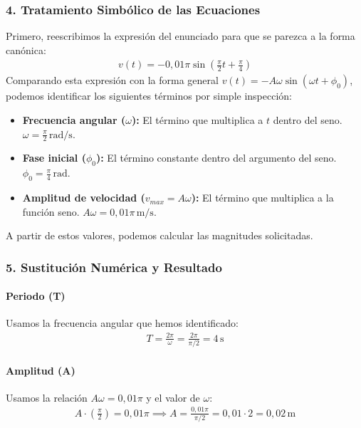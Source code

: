 \subsubsection*{4. Tratamiento Simbólico de las Ecuaciones}
Primero, reescribimos la expresión del enunciado para que se parezca a la forma canónica:
\begin{gather}
    v(t) = -0,01\pi \sin\left(\frac{\pi}{2}t + \frac{\pi}{4}\right)
\end{gather}
Comparando esta expresión con la forma general $v(t) = -A\omega \sin(\omega t + \phi_0)$, podemos identificar los siguientes términos por simple inspección:
\begin{itemize}
    \item \textbf{Frecuencia angular ($\omega$):} El término que multiplica a $t$ dentro del seno.
    $\omega = \frac{\pi}{2} \, \text{rad/s}$.
    \item \textbf{Fase inicial ($\phi_0$):} El término constante dentro del argumento del seno.
    $\phi_0 = \frac{\pi}{4} \, \text{rad}$.
    \item \textbf{Amplitud de velocidad ($v_{max} = A\omega$):} El término que multiplica a la función seno.
    $A\omega = 0,01\pi \, \text{m/s}$.
\end{itemize}
A partir de estos valores, podemos calcular las magnitudes solicitadas.

\subsubsection*{5. Sustitución Numérica y Resultado}
\paragraph{Periodo (T)}
Usamos la frecuencia angular que hemos identificado:
\begin{gather}
    T = \frac{2\pi}{\omega} = \frac{2\pi}{\pi/2} = 4 \, \text{s}
\end{gather}

\paragraph{Amplitud (A)}
Usamos la relación $A\omega = 0,01\pi$ y el valor de $\omega$:
\begin{gather}
    A \cdot \left(\frac{\pi}{2}\right) = 0,01\pi \implies A = \frac{0,01\pi}{\pi/2} = 0,01 \cdot 2 = 0,02 \, \text{m}
\end{gather}

